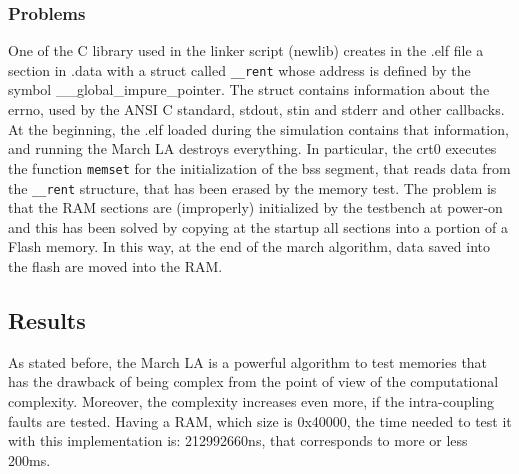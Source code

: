 \documentclass[paper=a4, fontsize=10pt]{scrartcl}	%
\begin{document}
	\subsubsection{Problems}
	One of the C library used in the linker script (newlib) creates in the .elf file a section in .data with a struct called \texttt{\_\_rent} whose address is defined by the symbol \_\_global\_impure\_pointer. The struct contains information about the errno, used by the ANSI C standard, stdout, stin and stderr and other callbacks.
	At the beginning, the .elf loaded during the simulation contains that information, and running the March LA destroys everything. In particular, the crt0 executes the function \texttt{memset} for the initialization of the bss segment, that reads data from the \texttt{\_\_rent} structure, that has been erased by the memory test.
	The problem is that the RAM sections are (improperly) initialized by the testbench at power-on and this has been solved by copying at the startup all sections into a portion of a Flash memory. In this way, at the end of the march algorithm, data saved into the flash are moved into the RAM.
	
	\subsection{Results}
	As stated before, the March LA is a powerful algorithm to test memories that has the drawback of being complex from the point of view of the computational complexity. Moreover, the complexity increases even more, if the intra-coupling faults are tested. Having a RAM, which size is 0x40000, the time needed to test it with this implementation is: 212992660ns, that corresponds to more or less 200ms.
\end{document}
